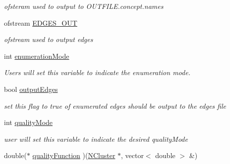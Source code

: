 \begin{DoxyCompactItemize}
\begin{DoxyCompactList}\small\item\em ofsteram used to output to OUTFILE.concept.names \item\end{DoxyCompactList}\item 
\hypertarget{class_lattice_algos_a8c66434bca63e339447fac71f9768e3d}{
ofstream \hyperlink{class_lattice_algos_a8c66434bca63e339447fac71f9768e3d}{EDGES\_\-OUT}}
\label{class_lattice_algos_a8c66434bca63e339447fac71f9768e3d}

\begin{DoxyCompactList}\small\item\em ofstream used to output edges \item\end{DoxyCompactList}\item 
\hypertarget{class_lattice_algos_a03adc61166377c993b4d1ef8f8ee12ee}{
int \hyperlink{class_lattice_algos_a03adc61166377c993b4d1ef8f8ee12ee}{enumerationMode}}
\label{class_lattice_algos_a03adc61166377c993b4d1ef8f8ee12ee}

\begin{DoxyCompactList}\small\item\em Users will set this variable to indicate the enumeration mode. \item\end{DoxyCompactList}\item 
\hypertarget{class_lattice_algos_a2b1820298424a735813176b799b784e2}{
bool \hyperlink{class_lattice_algos_a2b1820298424a735813176b799b784e2}{outputEdges}}
\label{class_lattice_algos_a2b1820298424a735813176b799b784e2}

\begin{DoxyCompactList}\small\item\em set this flag to true of enumerated edges should be output to the edges file \item\end{DoxyCompactList}\item 
\hypertarget{class_lattice_algos_aabdafd3fa45b3ed1d773b313e3a60e17}{
int \hyperlink{class_lattice_algos_aabdafd3fa45b3ed1d773b313e3a60e17}{qualityMode}}
\label{class_lattice_algos_aabdafd3fa45b3ed1d773b313e3a60e17}

\begin{DoxyCompactList}\small\item\em user will set this variable to indicate the desired qualityMode \item\end{DoxyCompactList}\item 
\hypertarget{class_lattice_algos_ae25f31284b5956278f390d0edc412ef8}{
double($\ast$ \hyperlink{class_lattice_algos_ae25f31284b5956278f390d0edc412ef8}{qualityFunction} )(\hyperlink{class_n_cluster}{NCluster} $\ast$, vector$<$ double $>$ \&)}
\label{class_lattice_algos_ae25f31284b5956278f390d0edc412ef8}


\end{DoxyCompactItemize}
